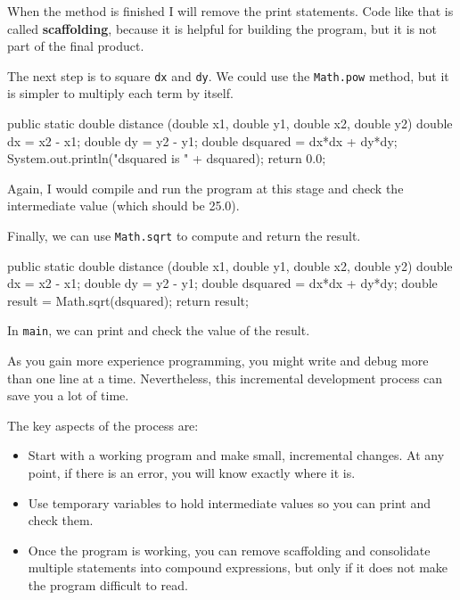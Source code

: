 \documentclass{book}
\begin{document}

When the method is finished I will remove the print statements.  Code
like that is called {\bf scaffolding}, because it is helpful for
building the program, but it is not part of the final product.

The next step is to square {\tt dx} and {\tt dy}.  We could use the
{\tt Math.pow} method, but it is simpler to multiply each term by
itself.

\begin{verbatimtab}
  public static double distance
              (double x1, double y1, double x2, double y2) {
    double dx = x2 - x1;
    double dy = y2 - y1;
    double dsquared = dx*dx + dy*dy;
    System.out.println("dsquared is " + dsquared);
    return 0.0;
  }
\end{verbatimtab}
%
Again, I would compile and run the program at this stage
and check the intermediate value (which should be 25.0).

Finally, we can use {\tt Math.sqrt} to compute and
return the result.

\begin{verbatimtab}
  public static double distance
              (double x1, double y1, double x2, double y2) {
    double dx = x2 - x1;
    double dy = y2 - y1;
    double dsquared = dx*dx + dy*dy;
    double result = Math.sqrt(dsquared);
    return result;
  }
\end{verbatimtab}
%
In {\tt main}, we can print and check the value of the result.

As you gain more experience programming, you might
write and debug more than one line at a time.  Nevertheless,
this incremental development process can save you a lot of
time.

The key aspects of the process are:

\begin{itemize}

\item Start with a working program and make small, incremental
changes.  At any point, if there is an error, you will know
exactly where it is.

\item Use temporary variables to hold intermediate values so
you can print and check them.

\item Once the program is working, you can remove
scaffolding and consolidate multiple statements into
compound expressions, but only if it does not make the program
difficult to read.

\end{itemize}
\end{document}
